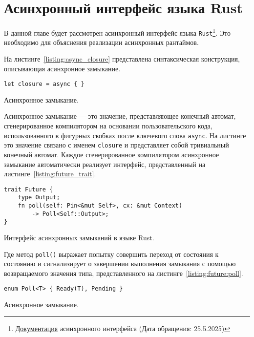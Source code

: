 \section{Асинхронный интерфейс языка Rust}

В данной главе будет рассмотрен асинхронный интерфейс языка \verb|Rust|\footnote{\href{https://doc.rust-lang.org/std/task/index.html}{Документация} асинхронного интерфейса (Дата обращения: 25.5.2025)}. Это необходимо для объяснения реализации асинхронных рантаймов.

На листинге~\ref{listing:async_closure} представлена синтаксическая конструкция, описывающая асинхронное замыкание.

\begin{listing}[H]
    \begin{verbatim}
let closure = async { }
    \end{verbatim}

    \caption{Асинхронное замыкание.}
    \label{listing:async_closure}
\end{listing}

Асинхронное замыкание --- это значение, представляющее конечный автомат, сгенерированное компилятором на основании пользовательского кода, использованного в фигурных скобках после ключевого слова \verb|async|. На листинге это значение связано с именем \verb|closure| и представляет собой тривиальный конечный автомат. Каждое сгенерированное компилятором асинхронное замыкание автоматически реализует интерфейс, представленный на листинге~\ref{listing:future_trait}.

\begin{listing}[H]
    \begin{verbatim}
trait Future {
    type Output;
    fn poll(self: Pin<&mut Self>, cx: &mut Context)
        -> Poll<Self::Output>;
}
    \end{verbatim}

    \caption{Интерфейс асинхронных замыканий в языке Rust.}
    \label{listing:future_trait}
\end{listing}

Где метод \verb|poll()| выражает попытку совершить переход от состояния к состоянию и сигнализирует о завершении выполнения замыкания с помощью возвращаемого значения типа, представленного на листинге~\ref{listing:future:poll}.

\begin{listing}[H]
    \begin{verbatim}
enum Poll<T> { Ready(T), Pending }
    \end{verbatim}

    \caption{Асинхронное замыкание.}
    \label{listing:future:poll}
\end{listing}

